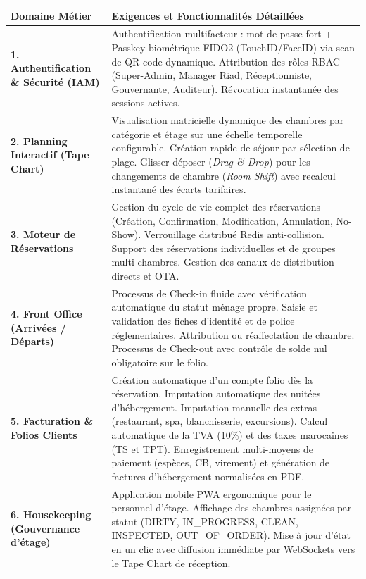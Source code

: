 \begin{table}[H]
\centering
\small
\renewcommand{\arraystretch}{1.3}
\begin{tabularx}{\textwidth}{|p{3.8cm}|X|}
\hline
\textbf{Domaine Métier} & \textbf{Exigences et Fonctionnalités Détaillées} \\
\hline
\textbf{1. Authentification \& Sécurité (IAM)} & Authentification multifacteur : mot de passe fort + Passkey biométrique FIDO2 (TouchID/FaceID) via scan de QR code dynamique. Attribution des rôles RBAC (Super-Admin, Manager Riad, Réceptionniste, Gouvernante, Auditeur). Révocation instantanée des sessions actives. \\
\hline
\textbf{2. Planning Interactif (Tape Chart)} & Visualisation matricielle dynamique des chambres par catégorie et étage sur une échelle temporelle configurable. Création rapide de séjour par sélection de plage. Glisser-déposer (\textit{Drag \& Drop}) pour les changements de chambre (\textit{Room Shift}) avec recalcul instantané des écarts tarifaires. \\
\hline
\textbf{3. Moteur de Réservations} & Gestion du cycle de vie complet des réservations (Création, Confirmation, Modification, Annulation, No-Show). Verrouillage distribué Redis anti-collision. Support des réservations individuelles et de groupes multi-chambres. Gestion des canaux de distribution directs et OTA. \\
\hline
\textbf{4. Front Office (Arrivées / Départs)} & Processus de Check-in fluide avec vérification automatique du statut ménage propre. Saisie et validation des fiches d'identité et de police réglementaires. Attribution ou réaffectation de chambre. Processus de Check-out avec contrôle de solde nul obligatoire sur le folio. \\
\hline
\textbf{5. Facturation \& Folios Clients} & Création automatique d'un compte folio dès la réservation. Imputation automatique des nuitées d'hébergement. Imputation manuelle des extras (restaurant, spa, blanchisserie, excursions). Calcul automatique de la TVA (10\%) et des taxes marocaines (TS et TPT). Enregistrement multi-moyens de paiement (espèces, CB, virement) et génération de factures d'hébergement normalisées en PDF. \\
\hline
\textbf{6. Housekeeping (Gouvernance d'étage)} & Application mobile PWA ergonomique pour le personnel d'étage. Affichage des chambres assignées par statut (DIRTY, IN\_PROGRESS, CLEAN, INSPECTED, OUT\_OF\_ORDER). Mise à jour d'état en un clic avec diffusion immédiate par WebSockets vers le Tape Chart de réception. \\

\end{tabularx}
\end{table}
